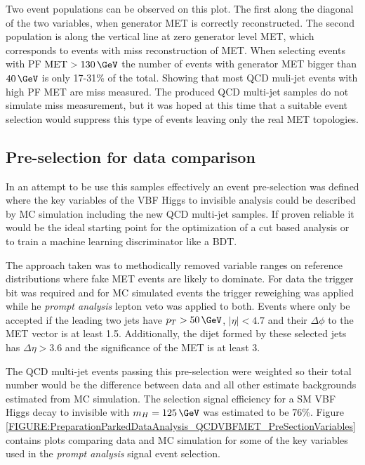 Two event populations can be observed on this plot. The first along the diagonal of the two variables, when generator \gls{MET} is correctly reconstructed. The second population is along the vertical line at zero generator level \gls{MET}, which corresponds to events with miss reconstruction of \gls{MET}. When selecting events with \gls{PF} $\text{MET}>130\,\GeV$ the number of events with generator \gls{MET} bigger than $40\,\GeV$ is only 17-31\% of the total. Showing that most \gls{QCD} muli-jet events with high \gls{PF} \gls{MET} are miss measured. The produced \gls{QCD} multi-jet samples do not simulate miss measurement, but it was hoped at this time that a suitable event selection would suppress this type of events leaving only the real \gls{MET} topologies.

\subsection{Pre-selection for data comparison}
\label{SECTION:PreparationParkedDataAnalysis_QCDVBFMETPreselection}


In an attempt to be use this samples effectively an event pre-selection was defined where the key variables of the \gls{VBF} Higgs to invisible analysis could be described by \gls{MC} simulation including the new \gls{QCD} multi-jet samples. If proven reliable it would be the ideal starting point for the optimization of a cut based analysis or to train a machine learning discriminator like a \gls{BDT}.

The approach taken was to methodically removed variable ranges on reference distributions where fake \gls{MET} events are likely to dominate. For data the trigger bit was required and for \gls{MC} simulated events the trigger reweighing was applied while he \textit{prompt analysis} lepton veto was applied to both. Events where only be accepted if the leading two jets have $p_T>50\,\GeV$, $|\eta|<4.7$ and their $\Delta\phi$ to the \gls{MET} vector is at least 1.5. Additionally, the dijet formed by these selected jets has $\Delta\eta>3.6$ and the significance of the \gls{MET} is at least 3. 

The \gls{QCD} multi-jet events passing this pre-selection were weighted so their total number would be the difference between data and all other estimate backgrounds estimated from \gls{MC} simulation. The selection signal efficiency for a \gls{SM} \gls{VBF} Higgs decay to invisible with $m_H=125\,\GeV$ was estimated to be 76\%. Figure \ref{FIGURE:PreparationParkedDataAnalysis_QCDVBFMET_PreSectionVariables} contains plots comparing data and \gls{MC} simulation for some of the key variables used in the \textit{prompt analysis} signal event selection.

